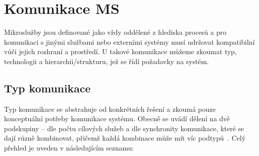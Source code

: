 \section{Komunikace MS}\label{sec:msa-communication}

Mikroslužby jsou definované jako vždy oddělené z hlediska procesů a pro komunikaci s jinými službami nebo externími systémy musí udržovat kompatibilní  vůči jejich rozhraní a prostředí.
U takové komunikace můžeme zkoumat typ, technologii a hierarchii/strukturu, jež se řídí požadavky na systém.



\subsection{Typ komunikace}\label{subsec:msa-communication-type}
Typ komunikace se abstrahuje od konkrétních řešení a zkoumá pouze konceptuální potřeby komunikace systému.
Obecně se uvádí dělení na dvě podskupiny – dle počtu cílových služeb a dle synchronity komunikace, které se dají různě kombinovat, přičemž každá kombinace může mít víc podtypů~\cite{msachris}.
Celý přehled je uveden v následujícím seznamu:

\newpage

